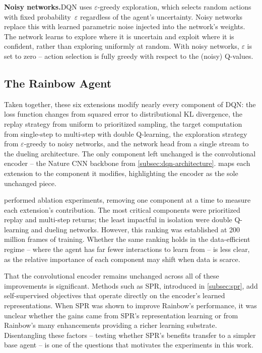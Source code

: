 

\smallskip
\textbf{Noisy networks.}\quad DQN uses $\varepsilon$-greedy
exploration, which selects random actions with fixed
probability~$\varepsilon$ regardless of the agent's uncertainty.
Noisy networks~\citep{fortunato2018noisy} replace this with learned
parametric noise injected into the network's weights. The network
learns to explore where it is uncertain and exploit where it is
confident, rather than exploring uniformly at random. With noisy
networks, $\varepsilon$ is set to zero -- action selection is fully
greedy with respect to the (noisy) Q-values.

\subsection{The Rainbow Agent}
\label{subsec:rainbow-agent}

Taken together, these six extensions modify nearly every component
of DQN: the loss function changes from squared error to
distributional KL divergence, the replay strategy from uniform to
prioritized sampling, the target computation from single-step to
multi-step with double Q-learning, the exploration strategy from
$\varepsilon$-greedy to noisy networks, and the network head from
a single stream to the dueling architecture. The only component
left unchanged is the convolutional encoder -- the Nature CNN
backbone from \cref{subsec:dqn-architecture}.
 maps each extension to the component
it modifies, highlighting the encoder as the sole unchanged piece.



\smallskip
\citet{hessel2018rainbow} performed ablation experiments, removing
one component at a time to measure each extension's contribution.
The most critical components were prioritized replay and multi-step
returns; the least impactful in isolation were double Q-learning and
dueling networks. However, this ranking was established at 200
million frames of training. Whether the same ranking holds in the
data-efficient regime -- where the agent has far fewer interactions
to learn from -- is less clear, as the relative importance of each
component may shift when data is scarce.

\smallskip
That the convolutional encoder remains unchanged across all of these
improvements is significant. Methods such as SPR, introduced in
\cref{subsec:spr}, add self-supervised objectives that operate
directly on the encoder's learned representations. When SPR was
shown to improve Rainbow's performance, it was unclear whether the
gains came from SPR's representation learning or from Rainbow's many
enhancements providing a richer learning substrate. Disentangling
these factors -- testing whether SPR's benefits transfer to a
simpler base agent -- is one of the questions that motivates the
experiments in this work.
